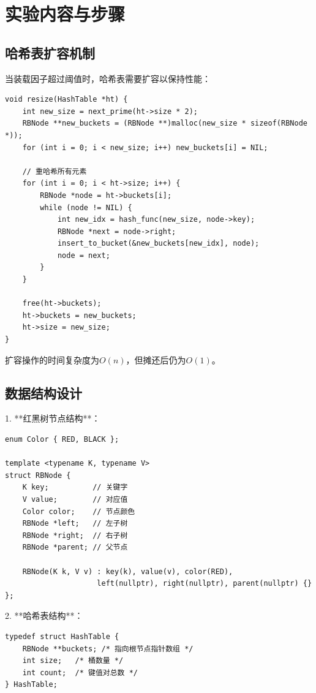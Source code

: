 \documentclass[12pt,a4paper]{article}
\begin{document}
\section{实验内容与步骤}

\subsection{哈希表扩容机制}
当装载因子超过阈值时，哈希表需要扩容以保持性能：

\begin{lstlisting}[caption=哈希表扩容实现]
void resize(HashTable *ht) {
    int new_size = next_prime(ht->size * 2);
    RBNode **new_buckets = (RBNode **)malloc(new_size * sizeof(RBNode *));
    for (int i = 0; i < new_size; i++) new_buckets[i] = NIL;
    
    // 重哈希所有元素
    for (int i = 0; i < ht->size; i++) {
        RBNode *node = ht->buckets[i];
        while (node != NIL) {
            int new_idx = hash_func(new_size, node->key);
            RBNode *next = node->right;
            insert_to_bucket(&new_buckets[new_idx], node);
            node = next;
        }
    }
    
    free(ht->buckets);
    ht->buckets = new_buckets;
    ht->size = new_size;
}
\end{lstlisting}

扩容操作的时间复杂度为$O(n)$，但摊还后仍为$O(1)$。
\subsection{数据结构设计}
1. **红黑树节点结构**：
\begin{lstlisting}
enum Color { RED, BLACK };

template <typename K, typename V>
struct RBNode {
    K key;          // 关键字
    V value;        // 对应值
    Color color;    // 节点颜色
    RBNode *left;   // 左子树
    RBNode *right;  // 右子树
    RBNode *parent; // 父节点

    RBNode(K k, V v) : key(k), value(v), color(RED),
                     left(nullptr), right(nullptr), parent(nullptr) {}
};
\end{lstlisting}

2. **哈希表结构**：
\begin{lstlisting}
typedef struct HashTable {
    RBNode **buckets; /* 指向根节点指针数组 */
    int size;   /* 桶数量 */
    int count;  /* 键值对总数 */
} HashTable;
\end{lstlisting}
\end{document}

